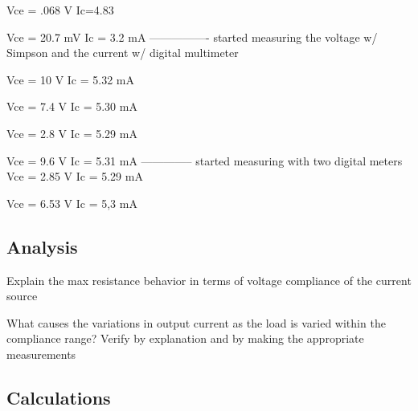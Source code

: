 \documentclass[12pt,letterpaper]{report}
\begin{document}
Vce = .068 V
Ic=4.83

Vce = 20.7 mV
Ic = 3.2 mA
---------------- started measuring the voltage w/ Simpson and the current w/ digital multimeter

Vce = 10 V
Ic = 5.32 mA

Vce = 7.4 V
Ic = 5.30 mA

Vce = 2.8 V
Ic = 5.29 mA

Vce = 9.6 V
Ic = 5.31 mA
-------------- started measuring with two digital meters
Vce = 2.85 V
Ic = 5.29 mA

Vce = 6.53 V
Ic = 5,3 mA

\subsection*{Analysis}

Explain the max resistance behavior in terms of voltage compliance of the current source

What causes the variations in output current as the load is varied within the compliance range? Verify by explanation and by making the appropriate measurements

\subsection*{Calculations}
\end{document}
